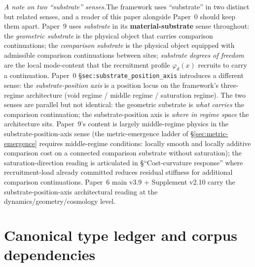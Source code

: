 \documentclass[11pt]{article}
\theoremstyle{remark}
\begin{document}
\smallskip\noindent\textit{A note on two ``substrate'' senses.}\quad The framework uses ``substrate'' in two distinct but related senses, and a reader of this paper alongside Paper~0 should keep them apart. Paper~9 uses \emph{substrate} in its \textbf{material-substrate} sense throughout: the \emph{geometric substrate} is the physical object that carries comparison continuations; the \emph{comparison substrate} is the physical object equipped with admissible comparison continuations between sites; \emph{substrate degrees of freedom} are the local mode-content that the recruitment profile $\varphi_d(x)$ recruits to carry a continuation. Paper~0 \S\texttt{sec:substrate\_position\_axis} introduces a different sense: the \emph{substrate-position axis} is a position locus on the framework's three-regime architecture (void regime / middle regime / saturation regime). The two senses are parallel but not identical: the geometric substrate is \emph{what carries} the comparison continuation; the substrate-position axis is \emph{where in regime space} the architecture sits. Paper~9's content is largely middle-regime physics in the substrate-position-axis sense (the metric-emergence ladder of \S\ref{sec:metric-emergence} requires middle-regime conditions: locally smooth and locally additive comparison cost on a connected comparison substrate without saturation); the saturation-direction reading is articulated in \S``Cost-curvature response'' where recruitment-load already committed reduces residual stiffness for additional comparison continuations. Paper~6 main v3.9 + Supplement v2.10 carry the substrate-position-axis architectural reading at the dynamics/geometry/cosmology level.


\section{Canonical type ledger and corpus dependencies}\label{sec:type-ledger}
\end{document}
